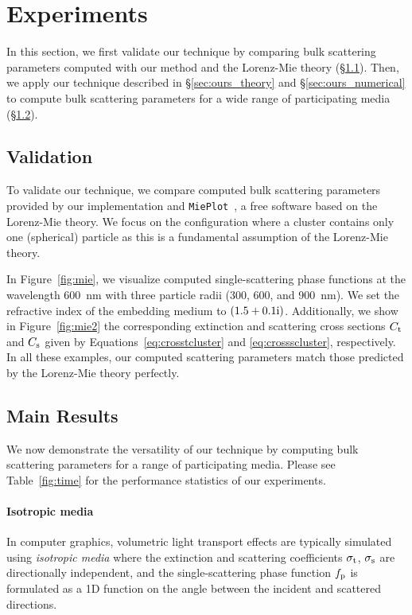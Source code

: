 \section{Experiments}
\label{sec:result}
%
In this section, we first validate our technique by comparing bulk scattering parameters computed with our method and the Lorenz-Mie theory (\S\ref{ssec:result_validation}).
Then, we apply our technique described in \S\ref{sec:ours_theory} and \S\ref{sec:ours_numerical} to compute bulk scattering parameters for a wide range of participating media (\S\ref{ssec:result_main}).



\subsection{Validation}
\label{ssec:result_validation}
%
To validate our technique, we compare computed bulk scattering parameters provided by our implementation and \texttt{MiePlot}~\cite{laven2011mieplot}, a free software based on the Lorenz-Mie theory.
We focus on the configuration where a cluster contains only one (spherical) particle as this is a fundamental assumption of the Lorenz-Mie theory.

In Figure~\ref{fig:mie}, we visualize computed single-scattering phase functions at the wavelength 600~nm with three particle radii (300, 600, and 900~nm).
We set the refractive index of the embedding medium to $(1.5 + 0.1\text{i})$.
Additionally, we show in Figure~\ref{fig:mie2} the corresponding extinction and scattering cross sections $C_\mathrm{t}$ and $C_\mathrm{s}$ given by Equations~\eqref{eq:crosstcluster} and \eqref{eq:crossscluster}, respectively.
In all these examples, our computed scattering parameters match those predicted by the Lorenz-Mie theory perfectly.

\subsection{Main Results}
\label{ssec:result_main}
%
We now demonstrate the versatility of our technique by computing bulk scattering parameters for a range of participating media.
Please see Table~\ref{fig:time} for the performance statistics of our experiments.




\paragraph{Isotropic media}
In computer graphics, volumetric light transport effects are typically simulated using \emph{isotropic media} where the extinction and scattering coefficients $\sigma_\mathrm{t}$, $\sigma_\mathrm{s}$ are directionally independent, and the single-scattering phase function $f_\mathrm{p}$ is formulated as a 1D function on the angle between the incident and scattered directions.


